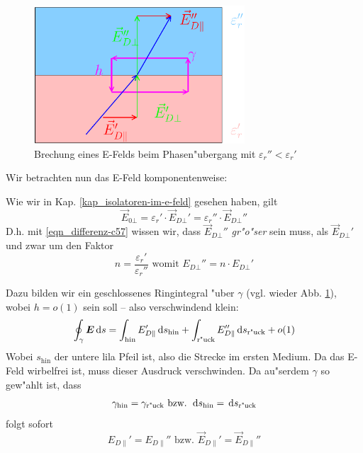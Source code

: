 \begin{figure}
   \centering
   \includegraphics[width=0.7\textwidth]{bilder/brechung}
   \caption{Brechung eines E-Felds beim Phasen"ubergang mit
     $\varepsilon_r'' < \varepsilon_r'$}
   \label{abb_brechung}
\end{figure}
Wir betrachten nun das E-Feld komponentenweise:
\begin{description}[\setlabelstyle{\bfseries\slshape}]
\item[Senkrecht zum Phasen"ubergang $\vec E_{D \bot}$] Wie wir in
   Kap. \ref{kap_isolatoren-im-e-feld} gesehen haben, gilt
   \begin{equation}
      \label{eqn_differenz-c56}
\vec E_{0 \bot}  =  \varepsilon_r' \cdot \vec E_{D \bot}' = \varepsilon_r'' \cdot \vec E_{D \bot}''
   \end{equation}
   D.h. mit \eqref{eqn_differenz-c57} wissen wir, dass $\vec E_{D \bot}''$
   \emph{gr"o"ser} sein muss, als $\vec E_{D \bot}'$ und zwar um den
   Faktor
   \begin{equation}
\label{eqn_differenz-c60}
      n = \frac{\varepsilon_r'}{\varepsilon_r''} \text{ womit } E_{D
        \bot}'' = n \cdot E_{D \bot}'
   \end{equation}

\item[Parallel zum Phasen"ubergang $\vec E_{D \|}$] Dazu bilden wir
   ein geschlossenes Ringintegral "uber $\gamma$ (vgl. wieder
   Abb. \ref{abb_brechung}), wobei $h = o(1)$ sein soll -- also
   verschwindend klein:
   \begin{equation}
      \label{eqn_differenz-c58}
      \oint_\gamma \boldsymbol{E} \, \mathrm{d} s =
 \int_\text{hin} E_{D \|}' \, \mathrm{d} s_\text{hin} +  \int_\text{r"uck} E_{D
   \|}'' \, \mathrm{d} s_\text{r"uck} + o(1)
   \end{equation}
   Wobei $s_\text{hin}$ der untere lila Pfeil ist, also die Strecke im
   ersten Medium. Da das E-Feld wirbelfrei ist, muss dieser Ausdruck
   verschwinden. Da au"serdem $\gamma$ so gew"ahlt ist, dass
   \begin{equation*}
      \gamma_\text{hin} = \gamma_\text{r"uck} \text{ bzw. } \, \mathrm{d}
      s_\text{hin} = \, \mathrm{d} s_\text{r"uck}
   \end{equation*}
   folgt sofort
   \begin{equation}
      \label{eqn_differenz-c59}
      E_{D \|}' = E_{D \|}''  \text{ bzw. } \vec E_{D \|}' = \vec E_{D \|}''
   \end{equation}
\end{description}

